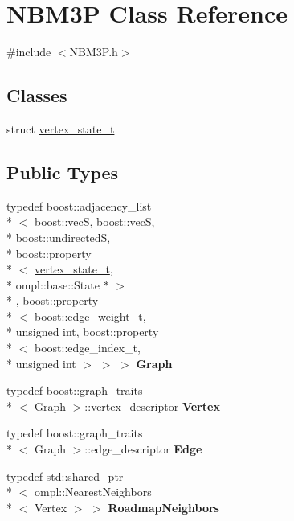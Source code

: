 \hypertarget{class_n_b_m3_p}{\section{N\-B\-M3\-P Class Reference}
\label{class_n_b_m3_p}
}


{\ttfamily \#include $<$N\-B\-M3\-P.\-h$>$}

\subsection*{Classes}
\begin{DoxyCompactItemize}
\item 
struct \hyperlink{struct_n_b_m3_p_1_1vertex__state__t}{vertex\-\_\-state\-\_\-t}
\end{DoxyCompactItemize}
\subsection*{Public Types}
\begin{DoxyCompactItemize}
\item 
\hypertarget{class_n_b_m3_p_af8678f7970fe5eac1c12030c711f927f}{typedef boost\-::adjacency\-\_\-list\\*
$<$ boost\-::vec\-S, boost\-::vec\-S, \\*
boost\-::undirected\-S, \\*
boost\-::property\\*
$<$ \hyperlink{struct_n_b_m3_p_1_1vertex__state__t}{vertex\-\_\-state\-\_\-t}, \\*
ompl\-::base\-::\-State $\ast$ $>$\\*
, boost\-::property\\*
$<$ boost\-::edge\-\_\-weight\-\_\-t, \\*
unsigned int, boost\-::property\\*
$<$ boost\-::edge\-\_\-index\-\_\-t, \\*
unsigned int $>$ $>$ $>$ {\bfseries Graph}}\label{class_n_b_m3_p_af8678f7970fe5eac1c12030c711f927f}

\item 
\hypertarget{class_n_b_m3_p_adaa54d5497edf2fcc353fd0b925282cc}{typedef boost\-::graph\-\_\-traits\\*
$<$ Graph $>$\-::vertex\-\_\-descriptor {\bfseries Vertex}}\label{class_n_b_m3_p_adaa54d5497edf2fcc353fd0b925282cc}

\item 
\hypertarget{class_n_b_m3_p_a1c3a2429dc0c4aaa965db2b09629d59a}{typedef boost\-::graph\-\_\-traits\\*
$<$ Graph $>$\-::edge\-\_\-descriptor {\bfseries Edge}}\label{class_n_b_m3_p_a1c3a2429dc0c4aaa965db2b09629d59a}

\item 
\hypertarget{class_n_b_m3_p_a805027e0ece50d49d31d64e7d8b9be64}{typedef std\-::shared\-\_\-ptr\\*
$<$ ompl\-::\-Nearest\-Neighbors\\*
$<$ Vertex $>$ $>$ {\bfseries Roadmap\-Neighbors}}\label{class_n_b_m3_p_a805027e0ece50d49d31d64e7d8b9be64}

\end{DoxyCompactItemize}
